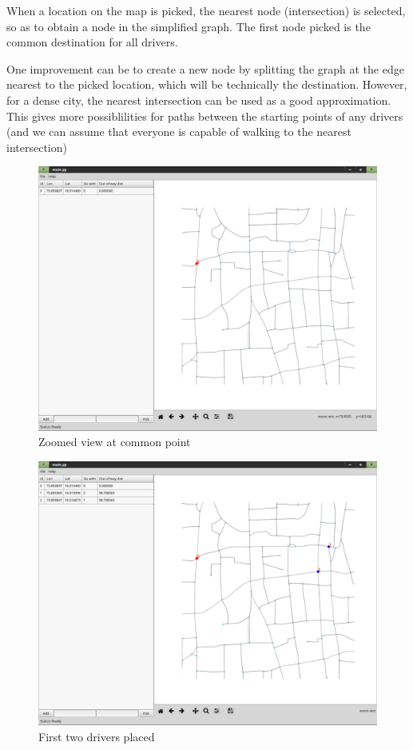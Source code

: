 \documentclass[main.tex]{subfiles}
\begin{document}
When a location on the map is picked, the nearest node (intersection) is
selected, so as to obtain a node in the simplified graph. The first node picked
is the common destination for all drivers.

One improvement can be to create a new node by splitting the graph at the edge
nearest to the picked location, which will be technically the destination.
However, for a dense city, the nearest intersection can be used as a good
approximation. This gives more possiblilities for paths between the starting
points of any drivers (and we can assume that everyone is capable of walking to
the nearest intersection)


\begin{figure}[htpb]
  \centering
  \includegraphics[width=0.8\linewidth]{scr_3.png}
  \caption{Zoomed view at common point}
  \label{fig:scr3}
\end{figure}


\begin{figure}[htpb]
  \centering
  \includegraphics[width=0.8\linewidth]{scr_4.png}
  \caption{First two drivers placed}
  \label{fig:scr4}
\end{figure}
\end{document}
